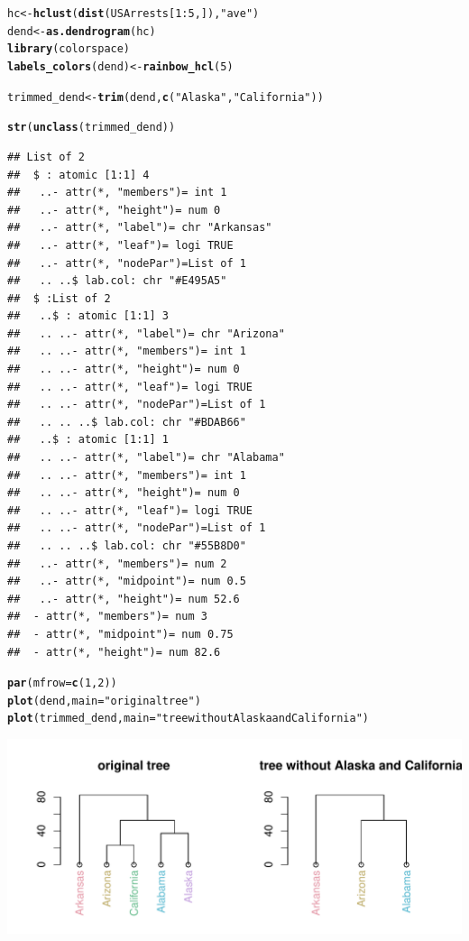 \documentclass[shortnames,nojss,article]{jss}\usepackage{graphicx, color}
\makeatletter
\def\maxwidth{ %
  \ifdim\Gin@nat@width>\linewidth
    \linewidth
  \else
    \Gin@nat@width
  \fi
}
\newcommand{\hlfunctioncall}[1]{\textcolor[rgb]{0.501960784313725,0,0.329411764705882}{\textbf{#1}}}%
\newcommand{\hlstring}[1]{\textcolor[rgb]{0.6,0.6,1}{#1}}%
\newenvironment{kframe}{%
 \def\at@end@of@kframe{}%
 \ifinner\ifhmode%
  \def\at@end@of@kframe{\end{minipage}}%
  \begin{minipage}{\columnwidth}%
 \fi\fi%
 \def\FrameCommand##1{\hskip\@totalleftmargin \hskip-\fboxsep
 \colorbox{shadecolor}{##1}\hskip-\fboxsep
     \hskip-\linewidth \hskip-\@totalleftmargin \hskip\columnwidth}%
 \MakeFramed {\advance\hsize-\width
   \@totalleftmargin\z@ \linewidth\hsize
   \@setminipage}}%
 {\par\unskip\endMakeFramed%
 \at@end@of@kframe}
\newenvironment{knitrout}{}{} %
\makeatother
\begin{document}
\begin{knitrout}
\color{fgcolor}\begin{kframe}
\begin{alltt}

hc <- \hlfunctioncall{hclust}(\hlfunctioncall{dist}(USArrests[1:5, ]), \hlstring{"ave"})
dend <- \hlfunctioncall{as.dendrogram}(hc)
\hlfunctioncall{library}(colorspace)
\hlfunctioncall{labels_colors}(dend) <- \hlfunctioncall{rainbow_hcl}(5)

trimmed_dend <- \hlfunctioncall{trim}(dend, \hlfunctioncall{c}(\hlstring{"Alaska"}, \hlstring{"California"}))

\hlfunctioncall{str}(\hlfunctioncall{unclass}(trimmed_dend))
\end{alltt}
\begin{verbatim}
## List of 2
##  $ : atomic [1:1] 4
##   ..- attr(*, "members")= int 1
##   ..- attr(*, "height")= num 0
##   ..- attr(*, "label")= chr "Arkansas"
##   ..- attr(*, "leaf")= logi TRUE
##   ..- attr(*, "nodePar")=List of 1
##   .. ..$ lab.col: chr "#E495A5"
##  $ :List of 2
##   ..$ : atomic [1:1] 3
##   .. ..- attr(*, "label")= chr "Arizona"
##   .. ..- attr(*, "members")= int 1
##   .. ..- attr(*, "height")= num 0
##   .. ..- attr(*, "leaf")= logi TRUE
##   .. ..- attr(*, "nodePar")=List of 1
##   .. .. ..$ lab.col: chr "#BDAB66"
##   ..$ : atomic [1:1] 1
##   .. ..- attr(*, "label")= chr "Alabama"
##   .. ..- attr(*, "members")= int 1
##   .. ..- attr(*, "height")= num 0
##   .. ..- attr(*, "leaf")= logi TRUE
##   .. ..- attr(*, "nodePar")=List of 1
##   .. .. ..$ lab.col: chr "#55B8D0"
##   ..- attr(*, "members")= num 2
##   ..- attr(*, "midpoint")= num 0.5
##   ..- attr(*, "height")= num 52.6
##  - attr(*, "members")= num 3
##  - attr(*, "midpoint")= num 0.75
##  - attr(*, "height")= num 82.6
\end{verbatim}
\begin{alltt}

\hlfunctioncall{par}(mfrow = \hlfunctioncall{c}(1, 2))
\hlfunctioncall{plot}(dend, main = \hlstring{"original tree"})
\hlfunctioncall{plot}(trimmed_dend, main = \hlstring{"tree without Alaska and California"})
\end{alltt}
\end{kframe}

{\centering \includegraphics[width=\maxwidth]{figure/unnamed-chunk-24} 

}



\end{knitrout}
\end{document}
